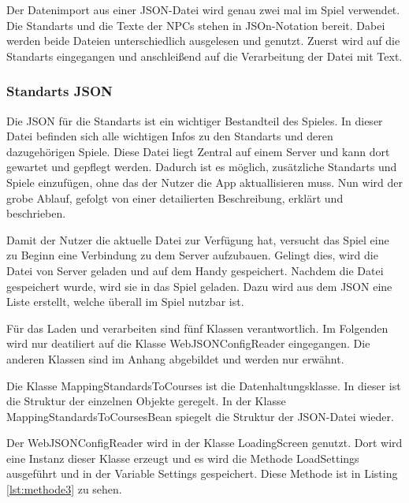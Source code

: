 Der Datenimport aus einer JSON-Datei wird genau zwei mal im Spiel verwendet. Die Standarts und die Texte der NPCs stehen in JSOn-Notation bereit. Dabei werden beide Dateien unterschiedlich ausgelesen und genutzt. Zuerst wird auf die Standarts eingegangen und anschleißend auf die Verarbeitung der Datei mit Text. 

\subsubsection{Standarts JSON}
Die JSON für die Standarts ist ein wichtiger Bestandteil des Spieles. In dieser Datei befinden sich alle wichtigen Infos zu den Standarts und deren dazugehörigen Spiele. Diese Datei liegt Zentral auf einem Server und kann dort gewartet und gepflegt werden. Dadurch ist es möglich, zusätzliche Standarts und Spiele einzufügen, ohne das der Nutzer die App aktuallisieren muss. Nun wird der grobe Ablauf, gefolgt von einer detailierten Beschreibung, erklärt und beschrieben.

Damit der Nutzer die aktuelle Datei zur Verfügung hat, versucht das Spiel eine zu Beginn eine Verbindung zu dem Server aufzubauen. Gelingt dies, wird die Datei von Server geladen und auf dem Handy gespeichert. Nachdem die Datei gespeichert wurde, wird sie in das Spiel geladen. Dazu wird aus dem JSON eine Liste erstellt, welche überall im Spiel nutzbar ist.

Für das Laden und verarbeiten sind fünf Klassen verantwortlich. Im Folgenden wird nur deatiliert auf die Klasse WebJSONConfigReader eingegangen. Die anderen Klassen sind im Anhang abgebildet und werden nur erwähnt.

Die Klasse MappingStandardsToCourses ist die Datenhaltungsklasse. In dieser ist die Struktur der einzelnen Objekte geregelt. In der Klasse MappingStandardsToCoursesBean spiegelt die Struktur der JSON-Datei wieder. 

Der WebJSONConfigReader wird in der Klasse LoadingScreen genutzt. Dort wird eine Instanz dieser Klasse erzeugt und es wird die Methode LoadSettings ausgeführt und in der Variable Settings gespeichert. Diese Methode ist in Listing \ref{lst:methode3} zu sehen.


